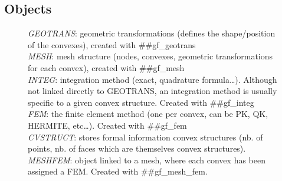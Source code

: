 \subsection{Objects}
\begin{figure}
\begin{center}
\T \begin{minipage}[c]{8cm}
\T \end{minipage}\T \hspace{.3cm}
\end{center}
\T \begin{center}
\T \begin{minipage}[c]{12cm}
  \small
  \textit{GEOTRANS}: geometric transformations (defines the shape/position of the convexes), created with ##gf\_geotrans\\
  \textit{MESH}: mesh structure (nodes, convexes, geometric transformations for each convex), created with ##gf\_mesh\\
  \textit{INTEG}: integration method (exact, quadrature formula\ldots).  Although
  not linked directly to GEOTRANS, an integration method is
  usually specific to a given convex structure. Created with ##gf\_integ \\
  \textit{FEM}: the finite element method (one per convex, can be PK, QK,
  HERMITE,
  etc\ldots). Created with ##gf\_fem \\
  \textit{CVSTRUCT}: stores formal information convex structures (nb. of
  points, nb. of faces which are themselves convex structures).\\
  \textit{MESHFEM}: object linked to a mesh, where each convex has been
  assigned a FEM. Created with  ##gf\_mesh\_fem.\\

\end{minipage}
\end{center}
\end{figure}
